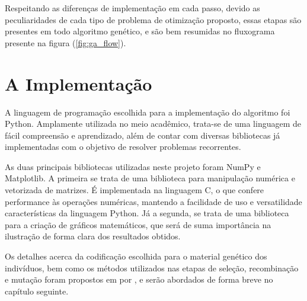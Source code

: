 Respeitando as diferenças de implementação em cada passo, devido as peculiaridades de cada tipo de problema
de otimização proposto, essas etapas são presentes em todo algoritmo genético, e são bem resumidas no fluxograma
presente na figura (\ref{fig:ga_flow}).



\section{A Implementação}

A linguagem de programação escolhida para a implementação do algoritmo foi Python. Amplamente utilizada no meio 
acadêmico, trata-se de uma linguagem de fácil compreensão e aprendizado, além de contar com diversas bibliotecas
já implementadas com o objetivo de resolver problemas recorrentes.

As duas principais bibliotecas utilizadas neste projeto foram NumPy\cite{harris2020array} e Matplotlib\cite{hunter2007}. 
A primeira se trata de uma biblioteca para manipulação numérica e vetorizada de matrizes. É implementada na linguagem C, 
o que confere performance às operações numéricas, mantendo a facilidade de uso e versatilidade características da linguagem
Python. Já a segunda, se trata de uma biblioteca para a criação de gráficos matemáticos, que será de suma importância
na ilustração de forma clara dos resultados obtidos.

Os detalhes acerca da codificação escolhida para o material genético dos indivíduos, bem como os métodos utilizados
nas etapas de seleção, recombinação e mutação foram propostos em \citeyear{roncaratti2006ga} por \citeauthor{roncaratti2006ga},
e serão abordados de forma breve no capítulo seguinte.
